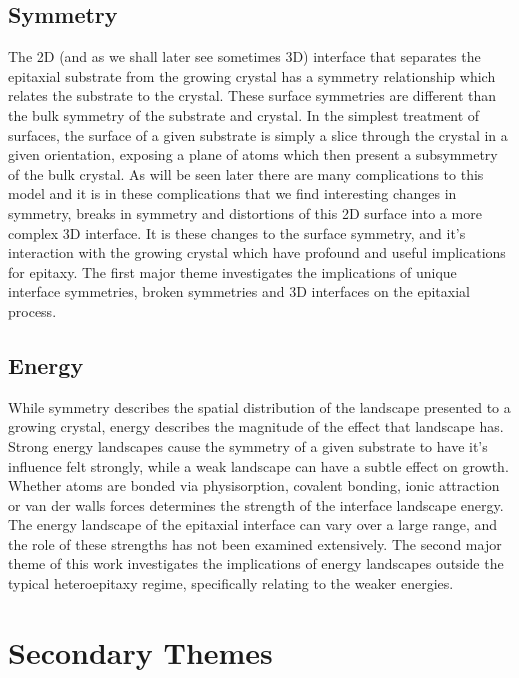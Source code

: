 \subsection{Symmetry}
The 2D (and as we shall later see sometimes 3D) interface that separates the epitaxial substrate from the growing crystal has a symmetry relationship which relates the substrate to the crystal.
These surface symmetries are different than the bulk symmetry of the substrate and crystal.
In the simplest treatment of surfaces, the surface of a given substrate is simply a slice through the crystal in a given orientation, exposing a plane of atoms which then present a subsymmetry of the bulk crystal.
As will be seen later there are many complications to this model and it is in these complications that we find interesting changes in symmetry, breaks in symmetry and distortions of this 2D surface into a more complex 3D interface.
It is these changes to the surface symmetry, and it's interaction with the growing crystal which have profound and useful implications for epitaxy.
The first major theme investigates the implications of unique interface symmetries, broken symmetries and 3D interfaces on the epitaxial process.

\subsection{Energy}
While symmetry describes the spatial distribution of the landscape presented to a growing crystal, energy describes the magnitude of the effect that landscape has.
Strong energy landscapes cause the symmetry of a given substrate to have it's influence felt strongly, while a weak landscape can have a subtle effect on growth. Whether atoms are bonded via physisorption, covalent bonding, ionic attraction or van der walls forces determines the strength of the interface landscape energy.
The energy landscape of the epitaxial interface can vary over a large range, and the role of these strengths has not been examined extensively.
The second major theme of this work investigates the implications of energy landscapes outside the typical heteroepitaxy regime, specifically relating to the weaker energies.

\section{Secondary Themes}
